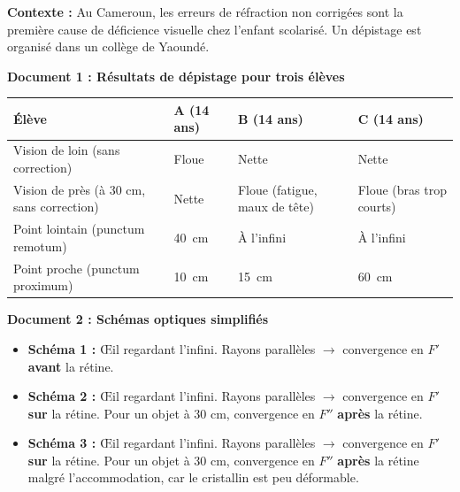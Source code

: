 \documentclass[11pt]{article}
\begin{document}
\begin{exercice}
\textbf{Contexte :} Au Cameroun, les erreurs de réfraction non corrigées sont la première cause de déficience visuelle chez l'enfant scolarisé. Un dépistage est organisé dans un collège de Yaoundé.

\textbf{Document 1 : Résultats de dépistage pour trois élèves}
\begin{center}
\begin{tabularx}{\linewidth}{|l|X|X|X|}\hline
\textbf{Élève} & \textbf{A (14 ans)} & \textbf{B (14 ans)} & \textbf{C (14 ans)} \\ \hline
Vision de loin (sans correction) & Floue & Nette & Nette \\ \hline
Vision de près (à 30 cm, sans correction) & Nette & Floue (fatigue, maux de tête) & Floue (bras trop courts) \\ \hline
Point lointain (punctum remotum) & \SI{40}{cm} & À l'infini & À l'infini \\ \hline
Point proche (punctum proximum) & \SI{10}{cm} & \SI{15}{cm} & \SI{60}{cm} \\ \hline
\end{tabularx}
\end{center}

\textbf{Document 2 : Schémas optiques simplifiés}
\begin{itemize}
\item \textbf{Schéma 1 :} Œil regardant l'infini. Rayons parallèles $\rightarrow$ convergence en $F'$ \textbf{avant} la rétine.
\item \textbf{Schéma 2 :} Œil regardant l'infini. Rayons parallèles $\rightarrow$ convergence en $F'$ \textbf{sur} la rétine. Pour un objet à 30 cm, convergence en $F''$ \textbf{après} la rétine.
\item \textbf{Schéma 3 :} Œil regardant l'infini. Rayons parallèles $\rightarrow$ convergence en $F'$ \textbf{sur} la rétine. Pour un objet à 30 cm, convergence en $F''$ \textbf{après} la rétine malgré l'accommodation, car le cristallin est peu déformable.
\end{itemize}


\end{exercice}
\end{document}
